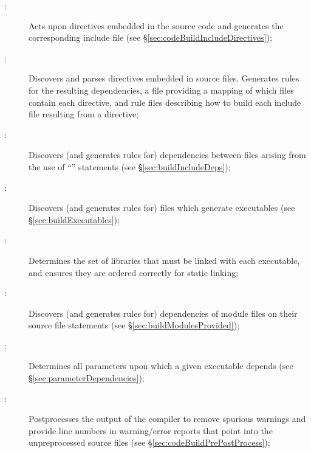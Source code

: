 \begin{description}

\item[:] Acts upon  directives embedded in the source code and generates the corresponding include file (see \S\ref{sec:codeBuildIncludeDirectives});

\item[:] Discovers and parses directives embedded in source files. Generates  rules for the resulting dependencies, a file providing a mapping of which files contain each directive, and rule files describing how to build each include file resulting from a  directive;

\item[:] Discovers (and generates rules for) dependencies between files arising from the use of ``'' statements (see \S\ref{sec:buildIncludeDeps});
  
\item[:] Discovers (and generates rules for) files which generate executables (see \S\ref{sec:buildExecutables});

\item[:] Determines the set of libraries that must be linked with each executable, and ensures they are ordered correctly for static linking;

\item[:] Discovers (and generates rules for) dependencies of module files on their source file statements (see \S\ref{sec:buildModulesProvided});

\item[:] Determines all parameters upon which a given executable depends (see \S\ref{sec:parameterDependencies});

\item[:] Postprocesses the output of the  compiler to remove spurious warnings and provide line numbers in warning/error reports that point into the unpreprocessed source files (see \S\ref{sec:codeBuildPrePostProcess});


\end{description}
